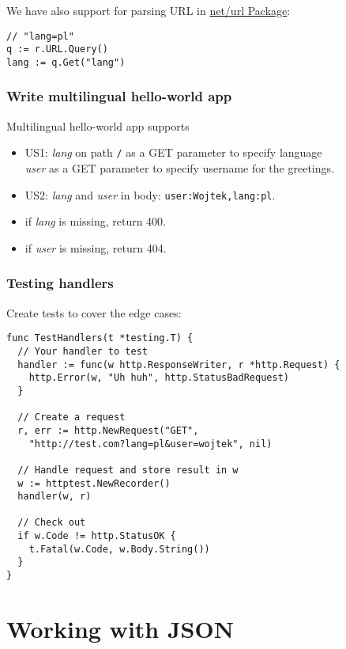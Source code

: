 \documentclass[11pt, letterpaper]{article}
\begin{document}
We have also support for parsing URL in \href{https://golang.org/pkg/net/url/}{net/url Package}:

\begin{verbatim}
// "lang=pl"
q := r.URL.Query()
lang := q.Get("lang")
\end{verbatim}

\subsubsection{Write multilingual hello-world app}

Multilingual hello-world app supports 

\begin{itemize}
\item US1: \emph{lang} on path \verb|/| as a GET parameter to specify language \\
       \emph{user} as a GET parameter to specify username for the greetings.
\item US2: \emph{lang} and  \emph{user} in body: \verb|user:Wojtek,lang:pl|.
\item if \emph{lang} is missing, return 400.
\item if \emph{user} is missing, return 404.
\end{itemize}

\subsubsection{Testing handlers}

Create tests to cover the edge cases:

\begin{verbatim}
func TestHandlers(t *testing.T) {
  // Your handler to test
  handler := func(w http.ResponseWriter, r *http.Request) {
    http.Error(w, "Uh huh", http.StatusBadRequest)
  }

  // Create a request
  r, err := http.NewRequest("GET",
    "http://test.com?lang=pl&user=wojtek", nil)

  // Handle request and store result in w
  w := httptest.NewRecorder()
  handler(w, r)

  // Check out
  if w.Code != http.StatusOK {
    t.Fatal(w.Code, w.Body.String())
  }
}
\end{verbatim}

\section{Working with JSON}
\end{document}
